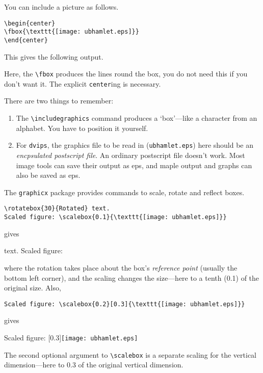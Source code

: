 \documentclass[a4paper]{article}
\begin{document}
You can include a picture as follows.
\begin{verbatim}
\begin{center}
\fbox{\texttt{[image: ubhamlet.eps]}}
\end{center}
\end{verbatim}

This gives the following output.
\begin{center}
\end{center}

Here, the \verb|\fbox| produces the lines round the box,
you do not need this if you don't want it.  The explicit
\verb|center|ing is necessary.

There are two things to remember:
\begin{enumerate}
\item The \verb|\includegraphics| command produces a `box'---like 
a character from an alphabet.  You have to position it yourself.
\item For \verb|dvips|, the graphics file to be read in (\verb|ubhamlet.eps|) 
here should be an \textit{encpsulated postscript file}.  An ordinary
postscript file doesn't work.  Most image tools can save their
output as eps, and maple output and graphs can also be saved as eps.
\end{enumerate}

The \verb|graphicx| package provides commands to scale,
rotate and reflect boxes.

\begin{verbatim}
\rotatebox{30}{Rotated} text. 
Scaled figure: \scalebox{0.1}{\texttt{[image: ubhamlet.eps]}}
\end{verbatim}
gives
\begin{center}
 text. 
Scaled figure: 
\end{center}
where the rotation takes place about the box's \textit{reference point}
(usually the bottom left corner), and the scaling changes the size---here
to a tenth (0.1) of the original size.
Also,
\begin{verbatim}
Scaled figure: \scalebox{0.2}[0.3]{\texttt{[image: ubhamlet.eps]}}
\end{verbatim}
gives
\begin{center}
Scaled figure: \scalebox{0.2}[0.3]{\texttt{[image: ubhamlet.eps]}}
\end{center}
The second optional argument to \verb|\scalebox| is a separate scaling
for the vertical dimension---here to 0.3 of the original vertical
dimension.
\end{document}
